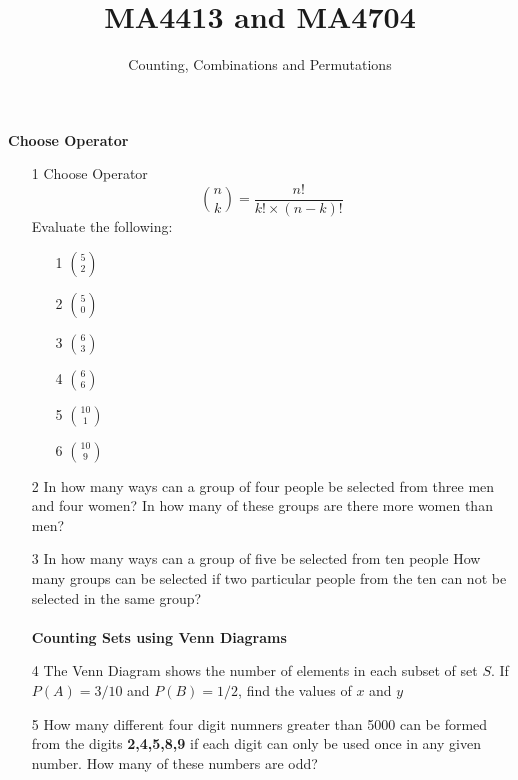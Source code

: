 \documentclass[12pt]{article}
\title{MA4413 and MA4704}
\author{Counting, Combinations and Permutations}
\begin{document}
\maketitle
\textbf{\;\;\;Choose Operator}
\begin{itemize}


\item[1] Choose Operator
\[ {n \choose k} = \frac{n!}{k! \times (n-k)!} \]
Evaluate the following:
\begin{multicols}{3}
    \begin{enumerate}
    \item[1] ${5 \choose 2}$
    \item[2] ${5 \choose 0}$
    \item[3] ${6 \choose 3}$
    \item[4] ${6 \choose 6}$
    \item[5] ${10 \choose 1}$
    \item[6] ${10 \choose 9}$
    \end{enumerate}        
  \end{multicols}
\item[2] In how many ways can a group of four people be selected from three men and four women?
In how many of these groups are there more women than men?
\item[3] In how many ways can a group of five be selected from ten people
How many groups can be selected if two particular people from the ten can not be selected in the same group?\\
\\
\textbf{Counting Sets using Venn Diagrams}
\item[4] 
The Venn Diagram shows the number of elements in each subset of set $S$.
If $P(A) = 3/10$ and $P(B) = 1/2$, find the values of $x$ and $y$

\item[5] How many different four digit numners greater than 5000 can be formed from the digits \textbf{2,4,5,8,9} if each digit can only be used once in any given number. How many of these numbers are odd?
\end{itemize}
\end{document}
